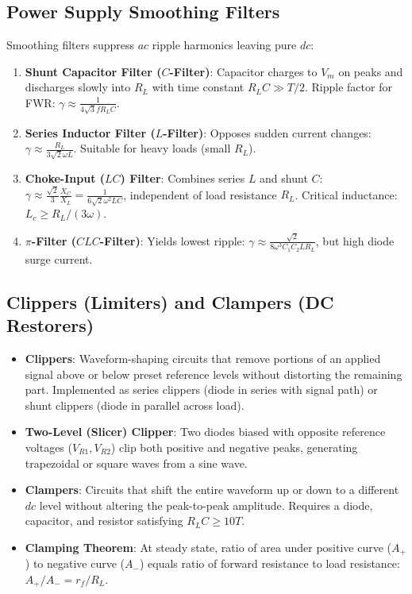 \documentclass[12pt,a4paper]{article}
\begin{document}
\subsection{Power Supply Smoothing Filters}
Smoothing filters suppress $ac$ ripple harmonics leaving pure $dc$:
\begin{enumerate}[leftmargin=1.5em, itemsep=2pt]
  \item \textbf{Shunt Capacitor Filter ($C$-Filter)}: Capacitor charges to $V_m$ on peaks and discharges slowly into $R_L$ with time constant $R_L C \gg T/2$. Ripple factor for FWR: $\gamma \approx \frac{1}{4\sqrt{3} f R_L C}$.
  \item \textbf{Series Inductor Filter ($L$-Filter)}: Opposes sudden current changes: $\gamma \approx \frac{R_L}{3\sqrt{2}\omega L}$. Suitable for heavy loads (small $R_L$).
  \item \textbf{Choke-Input ($LC$) Filter}: Combines series $L$ and shunt $C$: $\gamma \approx \frac{\sqrt{2}}{3}\frac{X_C}{X_L} = \frac{1}{6\sqrt{2}\omega^2 L C}$, independent of load resistance $R_L$. Critical inductance: $L_c \ge R_L / (3\omega)$.
  \item \textbf{$\pi$-Filter ($CLC$-Filter)}: Yields lowest ripple: $\gamma \approx \frac{\sqrt{2}}{8\omega^3 C_1 C_2 L R_L}$, but high diode surge current.
\end{enumerate}

\subsection{Clippers (Limiters) and Clampers (DC Restorers)}
\begin{itemize}[leftmargin=1.5em, itemsep=3pt]
  \item \textbf{Clippers}: Waveform-shaping circuits that remove portions of an applied signal above or below preset reference levels without distorting the remaining part. Implemented as series clippers (diode in series with signal path) or shunt clippers (diode in parallel across load).
  \item \textbf{Two-Level (Slicer) Clipper}: Two diodes biased with opposite reference voltages ($V_{R1}, V_{R2}$) clip both positive and negative peaks, generating trapezoidal or square waves from a sine wave.
  \item \textbf{Clampers}: Circuits that shift the entire waveform up or down to a different $dc$ level without altering the peak-to-peak amplitude. Requires a diode, capacitor, and resistor satisfying $R_L C \ge 10T$.
  \item \textbf{Clamping Theorem}: At steady state, ratio of area under positive curve ($A_+$) to negative curve ($A_-$) equals ratio of forward resistance to load resistance: $A_+ / A_- = r_f / R_L$.
\end{itemize}
\end{document}
